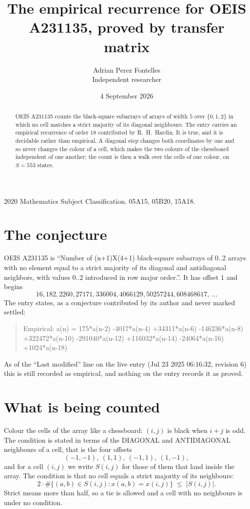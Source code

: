 \documentclass[11pt,a4paper]{article}
\title{The empirical recurrence for OEIS A231135, proved by transfer matrix}
\author{Adrian Perez Fontelles\\ \small Independent researcher}
\date{4 September 2026}
\theoremstyle{plain}
\theoremstyle{definition}
\begin{document}
\maketitle

\begin{abstract}
OEIS A231135 counts the black-square subarrays of arrays of width $5$ over $\{0,1,2\}$ in which
no cell matches a strict majority of its diagonal neighbours. The entry carries an empirical recurrence of order $18$ contributed by
R.~H.~Hardin. It is true, and it is decidable rather than empirical. A diagonal step changes
both coordinates by one and so never changes the colour of a cell, which makes the two colours
of the chessboard independent of one another; the count is then a walk over the cells of one
colour, on $S=553$ states.
\end{abstract}

\noindent\small 2020 Mathematics Subject Classification. 05A15, 05B20, 15A18.\normalsize

\section{The conjecture}

OEIS A231135 is ``Number of (n+1)X(4+1) black-square subarrays of 0..2 arrays with no element equal to a strict majority of its diagonal and antidiagonal neighbors, with values 0..2 introduced in row major order.''. It has offset $1$ and begins
\[
16, 182, 2260, 27171, 336004, 4066129, 50257244, 608468617,\ \dots
\]
The entry states, as a conjecture contributed by its author and never marked settled:
\begin{quote}
Empirical: a(n) = 175*a(n-2) -4017*a(n-4) +34311*a(n-6) -146236*a(n-8) +322472*a(n-10) -291040*a(n-12) +116032*a(n-14) -24064*a(n-16) +1024*a(n-18)
\end{quote}
As of the ``Last modified'' line on the live entry (Jul 23 2025 06:16:32, revision 6) this is still
recorded as empirical, and nothing on the entry records it as proved.

\section{What is being counted}

Colour the cells of the array like a chessboard: $(i,j)$ is black when $i+j$ is odd. The
condition is stated in terms of the DIAGONAL and ANTIDIAGONAL neighbours of a cell, that is the
four offsets
\[
(-1,-1),\ (1,1),\ (-1,1),\ (1,-1),
\]
and for a cell $(i,j)$ we write $S(i,j)$ for those of them that land inside the array. The
condition is that no cell equals a strict majority of its neighbours:
\[
2\cdot\#\{(a,b)\in S(i,j) : x(a,b)=x(i,j)\}\;\le\;|S(i,j)| .
\]
Strict means more than half, so a tie is allowed and a cell with no neighbours is under no condition.
\end{document}
